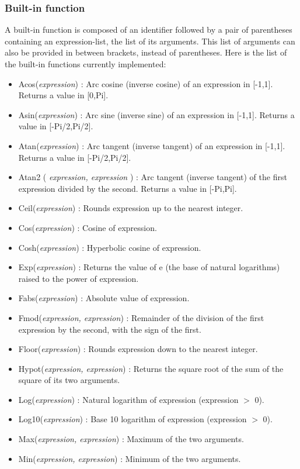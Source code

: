\documentclass[dvipdfmx, 9pt, a4paper]{article}
\numberwithin{equation}{section}
\begin{document}
\subsubsection{Built-in function}
A built-in function is composed of an identifier followed by a pair of parentheses containing an expression-list, the list of its arguments. This list of arguments can also be provided in between brackets, instead of parentheses. Here is the list of the built-in functions currently implemented:
\begin{itemize}
\item Acos({\it expression}) : Arc cosine (inverse cosine) of an expression in [-1,1]. Returns a value in [0,Pi].
\item Asin({\it expression}) : Arc sine (inverse sine) of an expression in [-1,1]. Returns a value in [-Pi/2,Pi/2].
\item Atan({\it expression}) : Arc tangent (inverse tangent) of an expression in [-1,1]. Returns a value in [-Pi/2,Pi/2].
\item Atan2 ( {\it expression, expression} ) : Arc tangent (inverse tangent) of the first expression divided by the second. Returns a value in [-Pi,Pi].
\item Ceil({\it expression}) : Rounds expression up to the nearest integer.
\item Cos({\it expression}) : Cosine of expression.
\item Cosh({\it expression}) : Hyperbolic cosine of expression.
\item Exp({\it expression}) : Returns the value of e (the base of natural logarithms) raised to the power of expression.
\item Fabs({\it expression}) : Absolute value of expression.
\item Fmod({\it expression, expression}) :  Remainder of the division of the first expression by the second, with the sign of the first.
\item Floor({\it expression}) : Rounds expression down to the nearest integer.
\item Hypot({\it expression, expression}) : Returns the square root of the sum of the square of its two arguments.
\item Log({\it expression}) : Natural logarithm of expression (expression $>$ 0).
\item Log10({\it expression}) : Base 10 logarithm of expression (expression $>$ 0).
\item Max({\it expression, expression}) : Maximum of the two arguments.
\item Min({\it expression, expression}) : Minimum of the two arguments.

\end{itemize}
\end{document}
